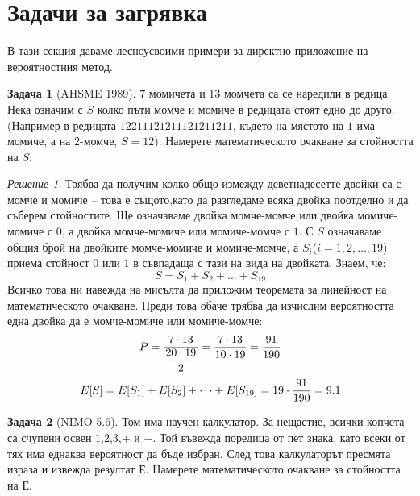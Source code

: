 \documentclass[11 pt, a4paper]{article}
\theoremstyle{definition}
\newtheorem{p}{Задача}
\theoremstyle{remark}
\newtheorem*{s}{Решение}
\begin{document}
\section{Задачи за загрявка }
В тази секция даваме лесноусвоими примери за директно приложение на вероятностния метод.
\begin{p}[AHSME 1989]

$7$ момичета и $13$ момчета са се наредили в редица. Нека означим с $S$ колко пъти момче и момиче в редицата стоят едно до друго.(Например в редицата $12211121211121211211$, където на мястото на $1$ има момиче, а на $2$-момче, $S=12$). Намерете математическото очакване за стойността на $S$.\par
\end{p}
\begin{s}
Трябва да получим колко общо измежду деветнадесетте двойки са с момче и момиче -- това е същото,като да разгледаме всяка двойка поотделно и да съберем стойностите. Ще означаваме двойка момче-момче или двойка момиче-момиче с $0$, а двойка момче-момиче или момиче-момче с $1$. С $S$ означаваме общия брой на двойките момче-момиче и момиче-момче, а $S_i$($i=1,2,\dots,19$) приема стойност $0$ или $1$ в съвпадаща с тази на вида на двойката. Знаем, че:
\begin{equation*}
S=S_1+S_2+\dots+S_{19}
\end{equation*}
Всичко това ни навежда на мисълта да приложим теоремата за линейност на математическото очакване. Преди това обаче трябва да изчислим вероятността една двойка да е момче-момиче или момиче-момче:\\
\begin{equation*}
P=\dfrac{7\cdot13}{\dfrac{20\cdot19}{2}}=\dfrac{7\cdot13}{10\cdot19}=\dfrac{91}{190}\\
\end{equation*}
\begin{equation*}
E[S]=E[S_1]+E[S_2]+\dots+E[S_{19}]=19\cdot\dfrac{91}{190}=9.1\\
\end{equation*}
\end{s}
\begin{p}[NIMO 5.6]

Том има научен калкулатор. За нещастие, всички копчета са счупени освен $1$,$2$,$3$,$+$ и $-$. Той въвежда поредица от пет знака, като всеки от тях има еднаква вероятност да бъде избран. След това калкулаторът пресмята израза и извежда резултат $Е$.
Намерете математическото очакване за стойността на $Е$.\par
\end{p}
\end{document}
